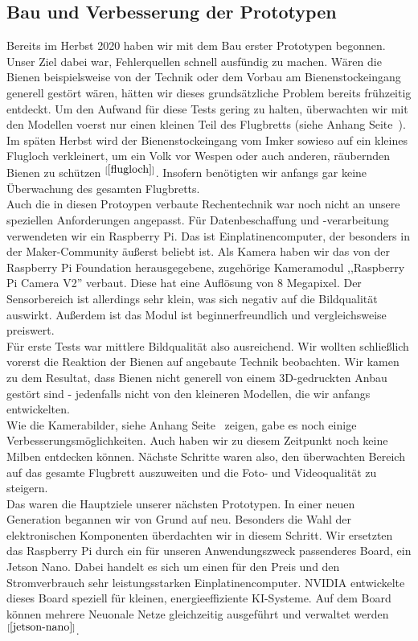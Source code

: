 \documentclass[11pt,a4paper]{article}
\newcommand{\bibRef}[1]{\hyperlink{#1}{$^{[\ref*{#1}{}]}$}}
\begin{document}
\subsection{Bau und Verbesserung der Prototypen}
Bereits im Herbst 2020 haben wir mit dem Bau erster Prototypen begonnen. Unser Ziel dabei war, Fehlerquellen schnell ausfündig zu machen. Wären die Bienen beispielsweise von der Technik oder dem Vorbau am Bienenstockeingang generell gestört wären, hätten wir dieses grundsätzliche Problem bereits frühzeitig entdeckt. Um den Aufwand für diese Tests gering zu halten, überwachten wir mit den Modellen voerst nur einen kleinen Teil des Flugbretts (siehe Anhang Seite \pageref*{fig:first-generation-1} \,).
Im späten Herbst wird der Bienenstockeingang vom Imker sowieso auf ein kleines Flugloch verkleinert, um ein Volk vor Wespen oder auch anderen, räubernden Bienen zu schützen \bibRef{flugloch}. Insofern benötigten wir anfangs gar keine Überwachung des gesamten Flugbretts.\\
Auch die in diesen Protoypen verbaute Rechentechnik war noch nicht an unsere speziellen Anforderungen angepasst. Für Datenbeschaffung und -verarbeitung verwendeten wir ein Raspberry Pi. Das ist Einplatinencomputer, der besonders in der Maker-Community äußerst beliebt ist. Als Kamera haben wir das von der Raspberry Pi Foundation herausgegebene, zugehörige Kameramodul ,,Raspberry Pi Camera V2'' verbaut. Diese hat eine Auflösung von 8 Megapixel. Der Sensorbereich ist allerdings sehr klein, was sich negativ auf die Bildqualität auswirkt. Außerdem ist das Modul ist beginnerfreundlich und vergleichsweise preiswert.\\
Für erste Tests war mittlere Bildqualität also ausreichend. Wir wollten schließlich vorerst die Reaktion der Bienen auf angebaute Technik beobachten. Wir kamen zu dem Resultat, dass Bienen nicht generell von einem 3D-gedruckten Anbau gestört sind - jedenfalls nicht von den kleineren Modellen, die wir anfangs entwickelten.\\
Wie die Kamerabilder, siehe Anhang Seite \pageref*{fig:first-generation-result} \,  zeigen, gabe es noch einige Verbesserungsmöglichkeiten. Auch haben wir zu diesem Zeitpunkt noch keine Milben entdecken können. Nächste Schritte waren also, den überwachten Bereich auf das gesamte Flugbrett auszuweiten und die Foto- und Videoqualität zu steigern.\\
Das waren die Hauptziele unserer nächsten Prototypen. In einer neuen Generation begannen wir von Grund auf neu. Besonders die Wahl der elektronischen Komponenten überdachten wir in diesem Schritt. Wir ersetzten das Raspberry Pi durch ein für unseren Anwendungszweck passenderes Board, ein Jetson Nano. Dabei handelt es sich um einen für den Preis und den Stromverbrauch sehr leistungsstarken Einplatinencomputer. NVIDIA entwickelte dieses Board speziell für kleinen, energieeffiziente KI-Systeme. Auf dem Board können mehrere Neuonale Netze gleichzeitig ausgeführt und verwaltet werden\bibRef{jetson-nano}.\\
\end{document}
